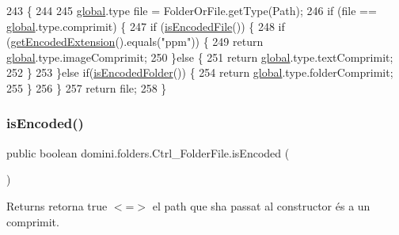 \begin{DoxyCode}
243                                            \{
244 
245         \hyperlink{namespaceglobal}{global}.type file = FolderOrFile.getType(Path);
246         \textcolor{keywordflow}{if} (file == \hyperlink{namespaceglobal}{global}.type.comprimit) \{
247             \textcolor{keywordflow}{if} (\hyperlink{classdomini_1_1folders_1_1Ctrl__FolderFile_a3198690e1ecc46e00431f35d87080d79}{isEncodedFile}()) \{
248                 \textcolor{keywordflow}{if} (\hyperlink{classdomini_1_1folders_1_1Ctrl__FolderFile_a61d9dfde0932787a2398af3ddf99c34b}{getEncodedExtension}().equals(\textcolor{stringliteral}{"ppm"})) \{
249                     \textcolor{keywordflow}{return} \hyperlink{namespaceglobal}{global}.type.imageComprimit;
250                 \}\textcolor{keywordflow}{else} \{
251                     \textcolor{keywordflow}{return} \hyperlink{namespaceglobal}{global}.type.textComprimit;
252                 \}
253             \}\textcolor{keywordflow}{else} \textcolor{keywordflow}{if}(\hyperlink{classdomini_1_1folders_1_1Ctrl__FolderFile_a095e6037e5cdf9a43806a308ca028791}{isEncodedFolder}()) \{
254                 \textcolor{keywordflow}{return} \hyperlink{namespaceglobal}{global}.type.folderComprimit;
255             \}
256         \}
257         \textcolor{keywordflow}{return} file;
258     \}
\end{DoxyCode}
\mbox{\label{classdomini_1_1folders_1_1Ctrl__FolderFile_a47a7ad955f1c579384dfba08bc7be8e0}} 
\subsubsection{\texorpdfstring{is\+Encoded()}{isEncoded()}}
{\footnotesize\ttfamily public boolean domini.\+folders.\+Ctrl\+\_\+\+Folder\+File.\+is\+Encoded (\begin{DoxyParamCaption}{ }\end{DoxyParamCaption})\hspace{0.3cm}{\ttfamily [inline]}}

\begin{DoxyReturn}{Returns}
retorna true $<$=$>$ el path que s\textquotesingle{}ha passat al constructor és a un comprimit. 
\end{DoxyReturn}

